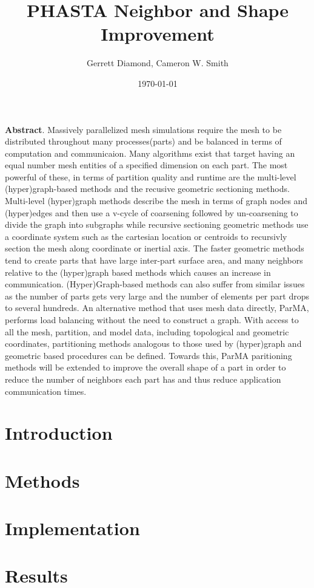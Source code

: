 \documentclass[a4paper]{article}
\title{PHASTA Neighbor and Shape Improvement}
\author{Gerrett Diamond, Cameron W. Smith}
\date{\today}
\begin{document}
\maketitle

\textbf{Abstract}. 
Massively parallelized mesh simulations require the mesh to be distributed
throughout many processes(parts) and be balanced in terms of computation and
communicaion. 
Many algorithms exist that target having an equal number mesh entities of a
specified dimension on each part. 
The most powerful of these, in terms of partition quality and runtime are the
multi-level (hyper)graph-based methods and the recusive geometric sectioning
methods. 
Multi-level (hyper)graph methods describe the mesh in terms of graph nodes and
(hyper)edges and then use a v-cycle of coarsening followed by un-coarsening to
divide the graph into subgraphs while recursive sectioning geometric methods use
a coordinate system such as the cartesian location or centroids to recursivly
section the mesh along coordinate or inertial axis. 
The faster geometric methods tend to create parts that have large inter-part
surface area, and many neighbors relative to the (hyper)graph based methods
which causes an increase in communication.
(Hyper)Graph-based methods can also suffer from similar issues as the number of
parts gets very large and the number of elements per part drops to several
hundreds. 
An alternative method that uses mesh data directly, ParMA, performs load 
balancing without the need to construct a graph. 
With access to all the mesh, partition, and model data, including topological and geometric coordinates, partitioning methods analogous to those used by (hyper)graph and geometric based procedures can be defined.
Towards this, ParMA paritioning methods will be extended to improve the overall shape of a part in order to reduce the number of neighbors each part has and thus reduce application communication times.  
 
\section{Introduction}

\section{Methods}


\section{Implementation}

\section{Results}

\newpage


\end{document}
